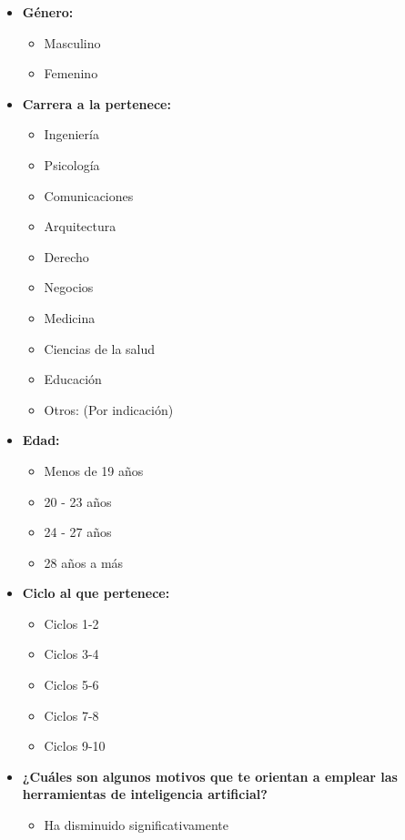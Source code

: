 \documentclass{article}
\newenvironment{recoleccionDeInformacion}{}{}
\begin{document}
\begin{recoleccionDeInformacion}
  \begin{multicols}{2}
    \begin{itemize}
      \item \textbf{Género:}
      \begin{itemize}
        \item Masculino
        \item Femenino
      \end{itemize}
      \item \textbf{Carrera a la pertenece:}
      \begin{itemize}
        \item Ingeniería
        \item Psicología
        \item Comunicaciones
        \item Arquitectura
        \item Derecho
        \item Negocios
        \item Medicina
        \item Ciencias de la salud
        \item Educación
        \item Otros: (Por indicación)
      \end{itemize}
      \item \textbf{Edad:}
      \begin{itemize}
        \item Menos de 19 años
        \item 20 - 23 años
        \item 24 - 27 años
        \item 28 años a más
      \end{itemize}
      \item \textbf{Ciclo al que pertenece:}
      \begin{itemize}
        \item Ciclos 1-2
        \item Ciclos 3-4
        \item Ciclos 5-6
        \item Ciclos 7-8
        \item Ciclos 9-10
      \end{itemize}
      \item \textbf{¿Cuáles son algunos motivos que te orientan a emplear las herramientas de inteligencia artificial?}
      \begin{itemize}
          \item Ha disminuido significativamente

\end{itemize}
\end{itemize}
\end{multicols}
\end{recoleccionDeInformacion}
\end{document}
